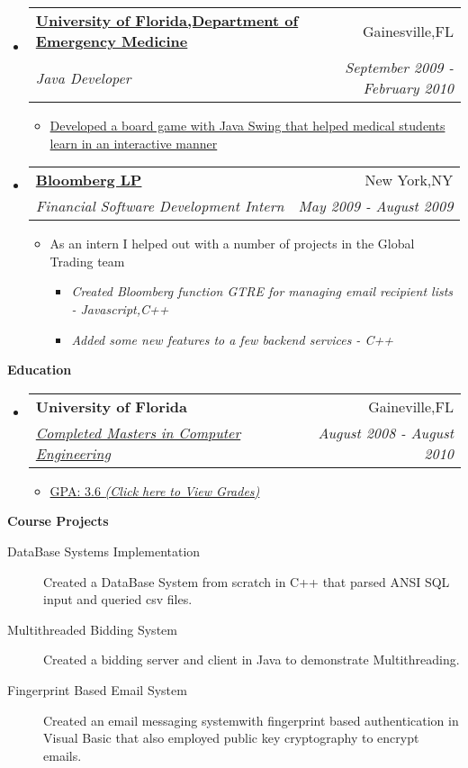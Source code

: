 \documentclass[letterpaper,11pt]{article}
\makeatletter
\newcommand{\resitem}[1]{\item #1 \vspace{-2pt}}
\newcommand{\resheading}[1]{{\large \colorbox{mygrey}{\begin{minipage}{\textwidth}{\textbf{#1 \vphantom{p\^{E}}}}\end{minipage}}}}
\newcommand{\ressubheading}[4]{
\begin{tabular*}{7.0in}{l@{\extracolsep{\fill}}r}
    \textbf{#1} & #2 \\
    \textit{#3} & \textit{#4} \\
\end{tabular*}\vspace{-6pt}}
\makeatother
\begin{document}
\begin{itemize}
\item
    \ressubheading{\href{http://emergency.med.ufl.edu}{University of Florida,Department of Emergency Medicine}}{Gainesville,FL}{Java Developer}{September 2009 - February 2010}
    \begin{itemize}
        \resitem{\href{http://onlinelibrary.wiley.com/doi/10.1111/j.1553-2712.2009.00392_16.x/abstract}{Developed a board game with Java Swing that helped medical students learn in an interactive manner}}
    \end{itemize}
                
\item
    \ressubheading{\href{http://www.bloomberg.com}{Bloomberg LP}}{New York,NY}{Financial Software Development Intern}{May 2009 - August 2009}
    \begin{itemize}
      \resitem{As an intern I helped out with a number of projects in the Global Trading team}
        \begin{itemize}
             \resitem{\emph{Created Bloomberg function GTRE for managing email recipient lists - Javascript,C++}}
            \resitem{\emph{Added some new features to a few backend services - C++ }}
         \end{itemize}
    \end{itemize}
    
    
\end{itemize}

  
\resheading{Education}
\begin{itemize}
\item
    \ressubheading{University of Florida}{Gaineville,FL}{\href{http://dl.dropbox.com/u/23360122/UF_Grades.pdf}{Completed Masters in Computer Engineering}}{August 2008 - August 2010}
    \begin{itemize}
        \resitem{\href{https://dl.dropboxusercontent.com/u/23360122/UF_GRADES.pdf}{GPA: 3.6 \emph{(Click here to View Grades)}}}
    \end{itemize}
\end{itemize}

\resheading{Course Projects}
\begin{description}
\item[DataBase Systems Implementation] Created a DataBase System from scratch in C++ that parsed ANSI SQL input and queried csv files.
\item[Multithreaded Bidding System] Created a bidding server and client in Java to demonstrate Multithreading.
\item[Fingerprint Based Email System] Created an email messaging systemwith fingerprint based authentication in Visual Basic that also employed public key cryptography to encrypt emails.
\end{description}
\end{document}
